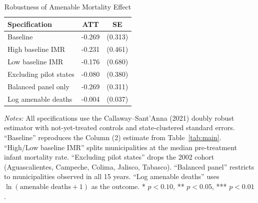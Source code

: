 \begin{table}[H]
\centering
\caption{Robustness of Amenable Mortality Effect}
\label{tab:robust}
\begin{threeparttable}
\begin{tabular}{lcc}
\toprule
Specification & ATT & SE \\
\midrule
Baseline & -0.269 & (0.313) \\
High baseline IMR & -0.231 & (0.461) \\
Low baseline IMR & -0.176 & (0.680) \\
Excluding pilot states & -0.080 & (0.380) \\
Balanced panel only & -0.269 & (0.311) \\
Log amenable deaths & -0.004 & (0.037) \\
\bottomrule
\end{tabular}
\begin{tablenotes}[flushleft]
\small
\item \textit{Notes:} All specifications use the Callaway--Sant'Anna (2021) doubly robust estimator with not-yet-treated controls and state-clustered standard errors. ``Baseline'' reproduces the Column (2) estimate from Table~\ref{tab:main}. ``High/Low baseline IMR'' splits municipalities at the median pre-treatment infant mortality rate. ``Excluding pilot states'' drops the 2002 cohort (Aguascalientes, Campeche, Colima, Jalisco, Tabasco). ``Balanced panel'' restricts to municipalities observed in all 15 years. ``Log amenable deaths'' uses $\ln(\text{amenable deaths} + 1)$ as the outcome. * $p<0.10$, ** $p<0.05$, *** $p<0.01$.
\end{tablenotes}
\end{threeparttable}
\end{table}
